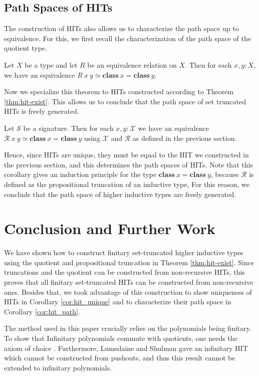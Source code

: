 \documentclass[9pt]{entcs}
\newcommand{\constructor}[1]{\mathbf{#1}}
\newcommand{\0}{\textbf{0}} %
\newcommand{\weq}{\simeq} %
\newcommand{\classof}{\constructor{class}} %
\newcommand{\sig}{\mathcal{S}} %
\newcommand{\CRC}{\mathcal{X}} %
\newcommand{\CRR}{\mathcal{R}} %
\begin{document}
\subsection{Path Spaces of HITs}
The construction of HITs also allows us to characterize the path space up to equivalence.
For this, we first recall the characterization of the path space of the quotient type.

\begin{proposition}
Let $X$ be a type and let $R$ be an equivalence relation on $X$.
Then for each $x, y : X$, we have an equivalence $R \> x \> y \weq \classof \> x = \classof \> y$.
\end{proposition}

Now we specialize this theorem to HITs constructed according to Theorem \ref{thm:hit-exist}.
This allows us to conclude that the path space of set truncated HITs is freely generated.

\begin{corollary}
\label{cor:hit_path}
Let $\sig$ be a signature.
Then for each $x, y : \CRC$ we have an equivalence $\CRR \> x \> y \weq \classof \> x = \classof \> y$ using $\CRC$ and $\CRR$ as defined in the previous section.
\end{corollary}

Hence, since HITs are unique, they must be equal to the HIT we constructed in the previous section, and this determines the path spaces of HITs.
Note that this corollary gives an induction principle for the type $\classof \> x = \classof \> y$, because $\CRR$ is defined as the propositional truncation of an inductive type,
For this reason, we conclude that the path space of higher inductive types are freely generated.

\section{Conclusion and Further Work}
\label{sec:conclusion}
We have shown how to construct finitary set-truncated higher inductive types using the quotient and propositional truncation in Theorem \ref{thm:hit-exist}.
Since truncations and the quotient can be constructed from non-recursive HITs, this proves that all finitary set-truncated HITs can be constructed from non-recursive ones.
Besides that, we took advantage of this construction to show uniqueness of HITs in Corollary \ref{cor:hit_unique} and to characterize their path space in Corollary \ref{cor:hit_path}.

The method used in this paper crucially relies on the polynomials being finitary.
To show that Infinitary polynomials commute with quotients, one needs the axiom of choice \cite{DBLP:journals/mscs/ChapmanUV19}.
Furthermore, Lumsdaine and Shulman gave an infinitary HIT which cannot be constructed from pushouts, and thus this result cannot be extended to infinitary polynomials.
\end{document}
